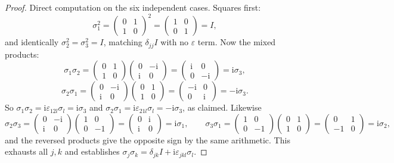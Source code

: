 \documentclass[11pt]{article}
\newcommand{\ii}{\mathrm{i}}
\theoremstyle{plain}
\theoremstyle{definition}
\begin{document}
\begin{proof}
Direct computation on the six independent cases. Squares first:
\[
\sigma_1^2=\begin{pmatrix}0&1\\1&0\end{pmatrix}^{\!2}=\begin{pmatrix}1&0\\0&1\end{pmatrix}=I,
\]
and identically $\sigma_2^2=\sigma_3^2=I$, matching $\delta_{jj}I$ with no $\varepsilon$ term.
Now the mixed products:
\[
\sigma_1\sigma_2=\begin{pmatrix}0&1\\1&0\end{pmatrix}\begin{pmatrix}0&-\ii\\ \ii&0\end{pmatrix}
=\begin{pmatrix}\ii&0\\0&-\ii\end{pmatrix}=\ii\sigma_3 ,
\]
\[
\sigma_2\sigma_1=\begin{pmatrix}0&-\ii\\ \ii&0\end{pmatrix}\begin{pmatrix}0&1\\1&0\end{pmatrix}
=\begin{pmatrix}-\ii&0\\0&\ii\end{pmatrix}=-\ii\sigma_3 .
\]
So $\sigma_1\sigma_2=\ii\varepsilon_{12l}\sigma_l=\ii\sigma_3$ and
$\sigma_2\sigma_1=\ii\varepsilon_{21l}\sigma_l=-\ii\sigma_3$, as claimed. Likewise
\[
\sigma_2\sigma_3=\begin{pmatrix}0&-\ii\\ \ii&0\end{pmatrix}\begin{pmatrix}1&0\\0&-1\end{pmatrix}
=\begin{pmatrix}0&\ii\\ \ii&0\end{pmatrix}=\ii\sigma_1 ,\qquad
\sigma_3\sigma_1=\begin{pmatrix}1&0\\0&-1\end{pmatrix}\begin{pmatrix}0&1\\1&0\end{pmatrix}
=\begin{pmatrix}0&1\\-1&0\end{pmatrix}=\ii\sigma_2 ,
\]
and the reversed products give the opposite sign by the same arithmetic. This exhausts all
$j,k$ and establishes $\sigma_j\sigma_k=\delta_{jk}I+\ii\varepsilon_{jkl}\sigma_l$.


\end{proof}
\end{document}
